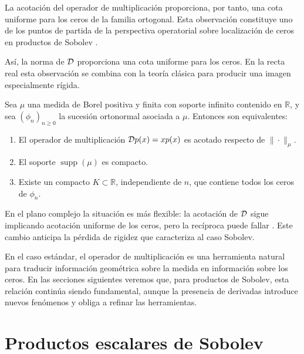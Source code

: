La acotación del operador de multiplicación proporciona, por tanto, una cota
uniforme para los ceros de la familia ortogonal. Esta observación constituye uno
de los puntos de partida de la perspectiva operatorial sobre localización de ceros
en productos de Sobolev \cite{CastroDuran2003,lopez1999zero,lopez2001sobolev,Rod01}.

Así, la norma de \(\mathcal{D}\) proporciona una cota uniforme para los ceros. En la recta
real esta observación se combina con la teoría clásica para producir una imagen
especialmente rígida.

\begin{cor}
	\label{cor:intro_equivalencias_reales}
	Sea \(\mu\) una medida de Borel positiva y finita con soporte infinito contenido en
	\(\mathbb R\), y sea \((\phi_n)_{n\ge 0}\) la sucesión ortonormal asociada a
	\(\mu\). Entonces son equivalentes:
	\begin{enumerate}
		\item[(i)] El operador de multiplicación \(\mathcal{D} p(x)=xp(x)\) es acotado
		      respecto de \(\|\cdot\|_\mu\).
		\item[(ii)] El soporte \(\operatorname{supp}(\mu)\) es compacto.
		\item[(iii)] Existe un compacto \(K\subset\mathbb R\), independiente de
		      \(n\), que contiene todos los ceros de \(\phi_n\).
	\end{enumerate}
\end{cor}

En el plano complejo la situación es más flexible: la acotación de \(\mathcal{D}\) sigue
implicando acotación uniforme de los ceros, pero la recíproca puede fallar
\cite{CastroDuran2003}. Este cambio anticipa la pérdida de rigidez que caracteriza
al caso Sobolev.

\medskip

En el caso estándar, el operador de multiplicación
es una herramienta natural para traducir información geométrica sobre la medida en
información sobre los ceros. En las secciones siguientes veremos que, para productos de
Sobolev, esta relación continúa siendo fundamental, aunque la presencia de derivadas
introduce nuevos fenómenos y obliga a refinar las herramientas.

\section{Productos escalares de Sobolev}
\label{sec:productos_sobolev_intro}

